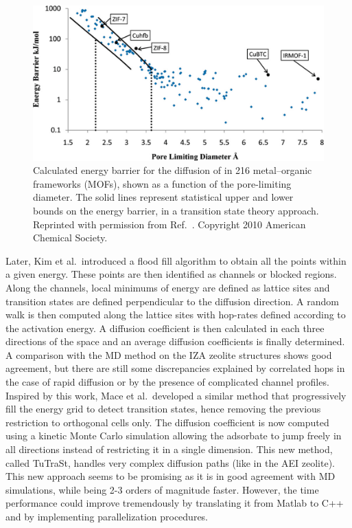 \documentclass[main.tex]{subfiles}
\begin{document}
\begin{figure}[ht]
\centering
  \includegraphics[width=0.7\linewidth]{figures/1-screening/Haldoupis_2010.jpeg}
  \caption{Calculated energy barrier for the diffusion of  in 216 metal--organic frameworks (MOFs), shown as a function of the pore-limiting diameter. The solid lines represent statistical upper and lower bounds on the energy barrier, in a transition state theory approach. Reprinted with permission from Ref.~. Copyright 2010 American Chemical Society.}
  \label{fgr:Haldoupis_2010}
\end{figure}

Later, Kim et al.\ introduced a flood fill algorithm to obtain all the points within a given energy.\cite{Kim_2013} These points are then identified as channels or blocked regions. Along the channels, local minimums of energy are defined as lattice sites and transition states are defined perpendicular to the diffusion direction. A random walk is then computed along the lattice sites with hop-rates defined according to the activation energy. A diffusion coefficient is then calculated in each three directions of the space and an average diffusion coefficients is finally determined.
A comparison with the MD method on the IZA zeolite structures shows good agreement, but there are still some discrepancies explained by correlated hops in the case of rapid diffusion or by the presence of complicated channel profiles. Inspired by this work, Mace et al.\ developed a similar method that progressively fill the energy grid to detect transition states, hence removing the previous restriction to orthogonal cells only.\cite{Mace_2019} The diffusion coefficient is now computed using a kinetic Monte Carlo simulation allowing the adsorbate to jump freely in all directions instead of restricting it in a single dimension. This new method, called TuTraSt, handles very complex diffusion paths (like in the AEI zeolite). This new approach seems to be promising as it is in good agreement with MD simulations, while being 2-3 orders of magnitude faster. However, the time performance could improve tremendously by translating it from Matlab to C++ and by implementing parallelization procedures.
\end{document}
